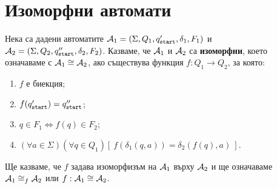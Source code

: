 \section{Изоморфни автомати}\label{sect:isomorphic}

Нека са дадени автоматите
$\mathcal{A}_1 = (\Sigma,Q_1,q_{\texttt{start}}',\delta_1,F_1)$ и $\mathcal{A}_2 = (\Sigma, Q_2, q_{\texttt{start}}'', \delta_2, F_2)$.
Казваме, че $\mathcal{A}_1$ и $\mathcal{A}_2$ са {\bf изоморфни}, което означаваме с $\mathcal{A}_1 \cong \mathcal{A}_2$, ако
съществува функция $f: Q_1\to Q_2$, за която:
\begin{enumerate}[(1)]
\item
  $f$ е биекция;
\item
  $f(q_{\texttt{start}}') = q_{\texttt{start}}''$;
\item
  $q \in F_1 \iff f(q) \in F_2$;
\item
  $(\forall a\in\Sigma)(\forall q\in Q_1)[\ f(\delta_1(q,a)) = \delta_2(f(q),a)\ ]$.
\end{enumerate}
Ще казваме, че $f$ задава изоморфизъм на $\mathcal{A}_1$ върху $\mathcal{A}_2$ и ще означаваме $\mathcal{A}_1 \cong_f \mathcal{A}_2$ или $f:\mathcal{A}_1 \cong \mathcal{A}_2$.

